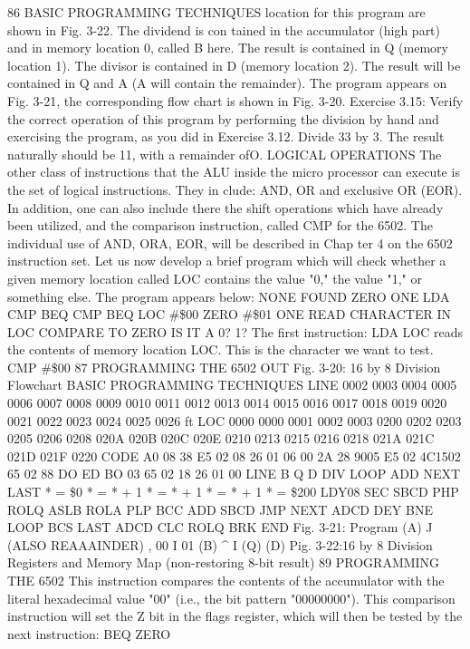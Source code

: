 \documentclass{book}
\begin{document}
86
BASIC PROGRAMMING TECHNIQUES
location for this program are shown in Fig. 3-22. The dividend is con
tained in the accumulator (high part) and in memory location 0, called B
here. The result is contained in Q (memory location 1). The divisor is
contained in D (memory location 2). The result will be contained in Q and
A (A will contain the remainder).
The program appears on Fig. 3-21, the corresponding flow chart is
shown in Fig. 3-20.
Exercise 3.15: Verify the correct operation of this program by
performing the division by hand and exercising the program, as
you did in Exercise 3.12. Divide 33 by 3. The result naturally
should be 11, with a remainder ofO.
LOGICAL OPERATIONS
The other class of instructions that the ALU inside the micro
processor can execute is the set of logical instructions. They in
clude: AND, OR and exclusive OR (EOR). In addition, one can also
include there the shift operations which have already been
utilized, and the comparison instruction, called CMP for the 6502.
The individual use of AND, ORA, EOR, will be described in Chap
ter 4 on the 6502 instruction set. Let us now develop a brief
program which will check whether a given memory location
called LOC contains the value "0," the value "1," or something
else. The program appears below:
NONE FOUND
ZERO
ONE
LDA
CMP
BEQ
CMP
BEQ
LOC
#\$00
ZERO
#\$01
ONE
READ CHARACTER IN LOC
COMPARE TO ZERO
IS IT A 0?
1?
The first instruction: LDA LOC reads the contents of memory
location LOC. This is the character we want to test.
CMP #\$00
87
PROGRAMMING THE 6502
OUT
Fig. 3-20: 16 by 8 Division Flowchart
BASIC PROGRAMMING TECHNIQUES
LINE
0002
0003
0004
0005
0006
0007
0008
0009
0010
0011
0012
0013
0014
0015
0016
0017
0018
0019
0020
0021
0022
0023
0024
0025
0026
ft LOC
0000
0000
0001
0002
0003
0200
0202
0203
0205
0206
0208
020A
020B
020C
020E
0210
0213
0215
0216
0218
021A
021C
021D
021F
0220
CODE
A0 08
38
E5 02
08
26 01
06 00
2A
28
9005
E5 02
4C1502
65 02
88
DO ED
BO 03
65 02
18
26 01
00
LINE
B
Q
D
DIV
LOOP
ADD
NEXT
LAST
* = \$0
* = * + 1
* = * + 1
* = * + 1
* = \$200
LDY08
SEC
SBCD
PHP
ROLQ
ASLB
ROLA
PLP
BCC ADD
SBCD
JMP NEXT
ADCD
DEY
BNE LOOP
BCS LAST
ADCD
CLC
ROLQ
BRK
END
Fig. 3-21: Program
(A) J
(ALSO REAAAINDER)
, 00
I
01
(B)
^ I
(Q)
(D)
Pig. 3-22:16 by 8 Division Registers and Memory Map (non-restoring 8-bit result)
89
PROGRAMMING THE 6502
This instruction compares the contents of the accumulator with
the literal hexadecimal value "00" (i.e., the bit pattern
"00000000"). This comparison instruction will set the Z bit in the
flags register, which will then be tested by the next instruction:
BEQ ZERO
\end{document}

